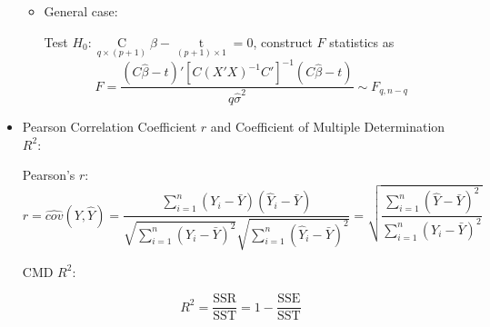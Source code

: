 \begin{itemize}[topsep=2pt,itemsep=2pt]
\begin{itemize}[topsep=2pt,itemsep=2pt]
        \item \hypertarget{HyperlinkGLT}{General case:} Test $ H_0: \mathop{C}\limits_{q\times (p+1)} \beta -\mathop{t}\limits_{(p+1)\times 1} =0 $, construct $ F $ statistics as
        \[
            F=\dfrac{ (C\hat{\beta }-t)'\left[C(X'X)^{-1}C'\right]^{-1}(C\hat{\beta }-t)  }{q\hat{\sigma }^2 }\sim F_{q,n-q  } 
        \]
        
        
        


    





    \end{itemize}
    
        






\item Pearson Correlation Coefficient $ r $ and Coefficient of Multiple Determination $ R^2 $:


    Pearson's $ r $:
    \begin{equation}
        r=\hat{cov}(Y,\hat{Y})=\dfrac{\sum\limits_{i=1}^n(Y_i-\bar{Y})(\hat{Y}_i-\bar{Y})}{\sqrt{\sum\limits_{i=1}^n(Y_i-\bar{Y})^2}\sqrt{\sum\limits_{i=1}^n(\hat{Y}_i-\bar{Y})^2}}=\sqrt{\dfrac{\sum\limits_{i=1}^n(\hat{Y}-\bar{Y})^2}{\sum\limits_{i=1}^n(Y_i-\bar{Y})^2}}
    \end{equation}
    
    CMD $ R^2 $:

    \begin{equation}
        R^2=\dfrac{\mathrm{SSR}}{\mathrm{SST}}=1-\dfrac{\mathrm{SSE}}{\mathrm{SST}}
    \end{equation}


\end{itemize}
